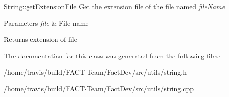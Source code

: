 \hyperlink{classUtils_1_1String_a6e5477352fbd3a4a0caed50bb14c0062}{String\-::get\-Extension\-File} Get the extension file of the file named {\itshape file\-Name} 


\begin{DoxyParams}{Parameters}
{\em file} & File name \\
\hline
\end{DoxyParams}
\begin{DoxyReturn}{Returns}
extension of file 
\end{DoxyReturn}


The documentation for this class was generated from the following files\-:\begin{DoxyCompactItemize}
\item 
/home/travis/build/\-F\-A\-C\-T-\/\-Team/\-Fact\-Dev/src/utils/string.\-h\item 
/home/travis/build/\-F\-A\-C\-T-\/\-Team/\-Fact\-Dev/src/utils/string.\-cpp\end{DoxyCompactItemize}

